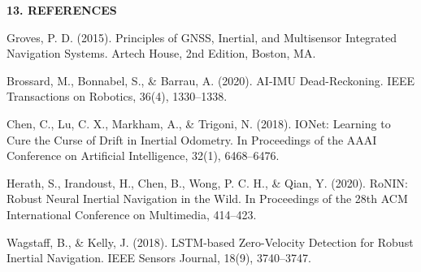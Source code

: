\documentclass[11pt,a4paper]{article}
\begin{document}
\vspace{0.15cm}
\begin{center}
{\large \textbf{13. REFERENCES}}
\end{center}

\small
\begin{enumerate}[label={[\arabic*].},leftmargin=0.9cm,itemsep=1.8pt]
\item Groves, P. D. (2015). Principles of GNSS, Inertial, and Multisensor Integrated Navigation Systems. Artech House, 2nd Edition, Boston, MA.
\item Brossard, M., Bonnabel, S., \& Barrau, A. (2020). AI-IMU Dead-Reckoning. IEEE Transactions on Robotics, 36(4), 1330--1338.
\item Chen, C., Lu, C. X., Markham, A., \& Trigoni, N. (2018). IONet: Learning to Cure the Curse of Drift in Inertial Odometry. In Proceedings of the AAAI Conference on Artificial Intelligence, 32(1), 6468--6476.
\item Herath, S., Irandoust, H., Chen, B., Wong, P. C. H., \& Qian, Y. (2020). RoNIN: Robust Neural Inertial Navigation in the Wild. In Proceedings of the 28th ACM International Conference on Multimedia, 414--423.
\item Wagstaff, B., \& Kelly, J. (2018). LSTM-based Zero-Velocity Detection for Robust Inertial Navigation. IEEE Sensors Journal, 18(9), 3740--3747.
\end{enumerate}
\newpage
\end{document}
